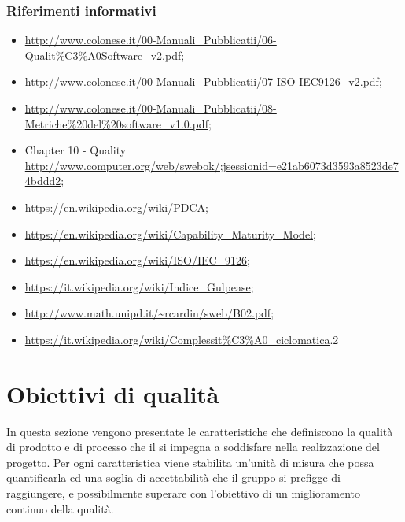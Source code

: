 \documentclass[a4paper, titlepage]{article}
\begin{document}
\subsubsection{Riferimenti informativi}
\label{rifinfo}
\begin{itemize}
\item {}
	\newline \url{http://www.colonese.it/00-Manuali_Pubblicatii/06-Qualit%C3%A0Software_v2.pdf};
\item {} 
	\newline \url{http://www.colonese.it/00-Manuali_Pubblicatii/07-ISO-IEC9126_v2.pdf};
\item {}
	\newline \url{http://www.colonese.it/00-Manuali_Pubblicatii/08-Metriche%20del%20software_v1.0.pdf};
\item {} Chapter 10 -  Quality
	\newline \url{http://www.computer.org/web/swebok/;jsessionid=e21ab6073d3593a8523de74bddd2};
\item {}
	\newline \url{https://en.wikipedia.org/wiki/PDCA};
\item {}
	\newline \url{https://en.wikipedia.org/wiki/Capability_Maturity_Model};
\item {}
	\newline \url{https://en.wikipedia.org/wiki/ISO/IEC_9126};
\item {}
	\newline \url{https://it.wikipedia.org/wiki/Indice_Gulpease};
\item {}
	\newline \url{http://www.math.unipd.it/~rcardin/sweb/B02.pdf};
\item {}
	\newline \url{https://it.wikipedia.org/wiki/Complessit%C3%A0_ciclomatica}.2
\end{itemize}

\newpage
\section{Obiettivi di qualità}
In questa sezione vengono presentate le caratteristiche che definiscono la qualità di prodotto e di processo che il  si impegna a soddisfare nella realizzazione del progetto. 
\newline Per ogni caratteristica viene stabilita un'unità di misura che possa quantificarla ed una soglia di accettabilità che il gruppo si prefigge di raggiungere, e possibilmente superare con l'obiettivo di un miglioramento continuo della qualità.
\end{document}
